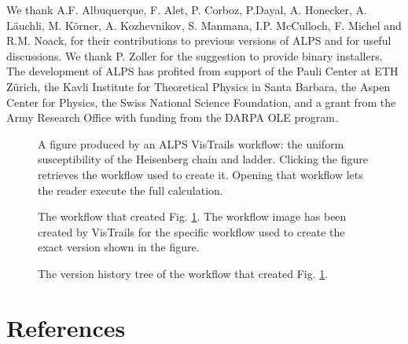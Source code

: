 \documentclass[12pt]{iopart}
\begin{document}
We thank A.F. Albuquerque, F. Alet, P. Corboz, P.Dayal, A. Honecker, A. L\"auchli, M. K\"orner,  A. Kozhevnikov, S. Manmana, I.P. McCulloch, F. Michel and R.M. Noack, for their contributions to previous versions of ALPS and  for useful discussions. We thank P. Zoller for the suggestion to provide binary installers. The development of ALPS has profited from support of the Pauli Center at ETH Z\"urich, the Kavli Institute for Theoretical Physics in Santa Barbara, the Aspen Center for Physics, the Swiss National Science Foundation, and a grant from the Army Research Office with funding from the DARPA OLE program.

\begin{figure}
\begin{center}

\caption{A figure produced by an ALPS VisTrails workflow: the uniform susceptibility of the Heisenberg chain and ladder. Clicking the figure retrieves the workflow used to create it. Opening that workflow lets the reader execute the full calculation.}
\label{figure}
\end{center}
\end{figure}


\begin{figure}
\begin{center}
\caption{The workflow that created Fig. \ref{figure}. The workflow image has been created by VisTrails for the specific workflow used to create the exact version shown in the figure.}
\label{workflow}
\end{center}
\end{figure}



\begin{figure}
\begin{center}
\caption{The version history tree of the workflow that created Fig. \ref{figure}.}
\end{center}
\end{figure}
\section*{References}


\end{document}
